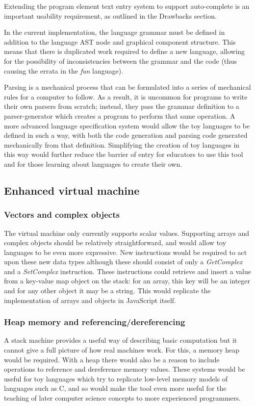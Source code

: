 Extending the program element text entry system to support auto-complete is an important usability requirement, as outlined in the Drawbacks section.

In the current implementation, the language grammar must be defined in addition to the language AST node and graphical component structure. This means that there is duplicated work required to define a new language, allowing for the possibility of inconsistencies between the grammar and the code (thus causing the errata in the \textit{fun} language).

Parsing is a mechanical process that can be formulated into a series of mechanical rules for a computer to follow. As a result, it is uncommon for programs to write their own parsers from scratch; instead, they pass the grammar definition to a parser-generator which creates a program to perform that same operation. A more advanced language specification system would allow the toy languages to be defined in such a way, with both the code generation and parsing code generated mechanically from that definition. Simplifying the creation of toy languages in this way would further reduce the barrier of entry for educators to use this tool and for those learning about languages to create their own.

\subsection{Enhanced virtual machine}

\subsubsection{Vectors and complex objects}

The virtual machine only currently supports scalar values. Supporting arrays and complex objects should be relatively straightforward, and would allow toy languages to be even more expressive. New instructions would be required to act upon these new data types although these should consist of only a \textit{GetComplex} and a \textit{SetComplex} instruction. These instructions could retrieve and insert a value from a key-value map object on the stack: for an array, this key will be an integer and for any other object it may be a string. This would replicate the implementation of arrays and objects in JavaScript itself.

\subsubsection{Heap memory and referencing/dereferencing}

A stack machine provides a useful way of describing basic computation but it cannot give a full picture of how real machines work. For this, a memory heap would be required. With a heap there would also be a reason to include operations to reference and dereference memory values. These systems would be useful for toy languages which try to replicate low-level memory models of languages such as C, and so would make the tool even more useful for the teaching of later computer science concepts to more experienced programmers.
